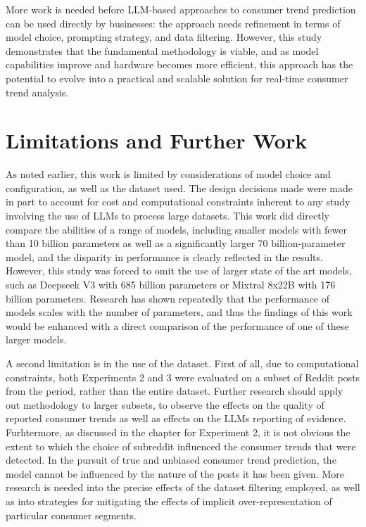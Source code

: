 \documentclass{report}
\begin{document}
More work is needed before LLM-based approaches to consumer trend prediction can be used directly by businesses: the approach needs refinement in terms of model choice, prompting strategy, and data filtering. However, this study demonstrates that the fundamental methodology is viable, and as model capabilities improve and hardware becomes more efficient, this approach has the potential to evolve into a practical and scalable solution for real-time consumer trend analysis.


\section{Limitations and Further Work}

As noted earlier, this work is limited by considerations of model choice and configuration, as well as the dataset used. The design decisions made were made in part to account for cost and computational constraints inherent to any study involving the use of LLMs to process large datasets. This work did directly compare the abilities of a range of models, including smaller models with fewer than 10 billion parameters as well as a significantly larger 70 billion-parameter model, and the disparity in performance is clearly reflected in the results. However, this study was forced to omit the use of larger state of the art models, such as Deepseek V3 with 685 billion parameters\cite{deepseekv3_2024} or Mixtral 8x22B with 176 billion parameters\cite{mistral_mixtral_2023}. Research has shown repeatedly that the performance of models scales with the number of parameters, and thus the findings of this work would be enhanced with a direct comparison of the performance of one of these larger models.

A second limitation is in the use of the dataset. First of all, due to computational constraints, both Experiments 2 and 3 were evaluated on a subset of Reddit posts from the period, rather than the entire dataset. Further research should apply out methodology to larger subsets, to observe the effects on the quality of reported consumer trends as well as effects on the LLMs reporting of evidence. Furhtermore, as discussed in the chapter for Experiment 2, it is not obvious the extent to which the choice of subreddit influenced the consumer trends that were detected. In the pursuit of true and unbiased consumer trend prediction, the model cannot be influenced by the nature of the posts it has been given. More research is needed into the precise effects of the dataset filtering employed, as well as into strategies for mitigating the effects of implicit over-representation of particular consumer segments.
\end{document}
